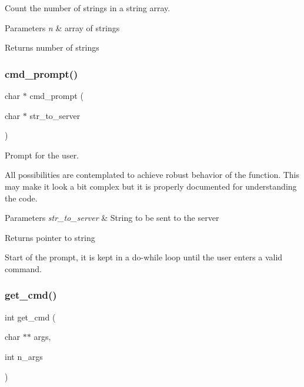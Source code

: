 Count the number of strings in a string array. 


\begin{DoxyParams}{Parameters}
{\em n} & array of strings \\
\hline
\end{DoxyParams}
\begin{DoxyReturn}{Returns}
number of strings 
\end{DoxyReturn}
\mbox{\label{bash_8c_a25c4fbe3c4c29c5234c424e6fbb9b84d}} 
\subsubsection{cmd\+\_\+prompt()}
{\footnotesize\ttfamily char $\ast$ cmd\+\_\+prompt (\begin{DoxyParamCaption}\item[{char $\ast$}]{str\+\_\+to\+\_\+server }\end{DoxyParamCaption})}



Prompt for the user. 

All possibilities are contemplated to achieve robust behavior of the function. This may make it look a bit complex but it is properly documented for understanding the code. 
\begin{DoxyParams}{Parameters}
{\em str\+\_\+to\+\_\+server} & String to be sent to the server \\
\hline
\end{DoxyParams}
\begin{DoxyReturn}{Returns}
pointer to string  
\end{DoxyReturn}
Start of the prompt, it is kept in a do-\/while loop until the user enters a valid command.\mbox{\label{bash_8c_a4eab3617254ab77fc2a44c5ff882f5f3}} 
\subsubsection{get\+\_\+cmd()}
{\footnotesize\ttfamily int get\+\_\+cmd (\begin{DoxyParamCaption}\item[{char $\ast$$\ast$}]{args,  }\item[{int}]{n\+\_\+args }\end{DoxyParamCaption})}



